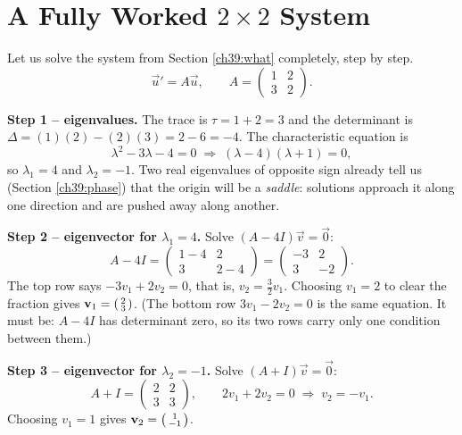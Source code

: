 \section{A Fully Worked \texorpdfstring{$2\times2$}{2x2} System}
\label{ch39:worked}

Let us solve the system from Section \ref{ch39:what} completely, step by step.
\[
  \vec u' = A\vec u, \qquad
  A = \begin{pmatrix} 1 & 2 \\ 3 & 2 \end{pmatrix}.
\]

\textbf{Step 1 -- eigenvalues.} The trace is $\tau = 1 + 2 = 3$ and the
determinant is $\Delta = (1)(2) - (2)(3) = 2 - 6 = -4$. The characteristic
equation is
\[
  \lambda^2 - 3\lambda - 4 = 0 \;\Longrightarrow\; (\lambda - 4)(\lambda + 1) = 0,
\]
so $\lambda_1 = 4$ and $\lambda_2 = -1$. Two real eigenvalues of opposite sign
already tell us (Section \ref{ch39:phase}) that the origin will be a
\emph{saddle}: solutions approach it along one direction and are pushed away
along another.

\textbf{Step 2 -- eigenvector for $\lambda_1 = 4$.} Solve $(A - 4I)\vec v = \vec
0$:
\[
  A - 4I = \begin{pmatrix} 1-4 & 2 \\ 3 & 2-4 \end{pmatrix}
         = \begin{pmatrix} -3 & 2 \\ 3 & -2 \end{pmatrix}.
\]
The top row says $-3v_1 + 2v_2 = 0$, that is, $v_2 = \tfrac{3}{2}v_1$. Choosing
$v_1 = 2$ to clear the fraction gives
$\vec v_1 = \begin{psmallmatrix} 2 \\ 3\end{psmallmatrix}$. (The bottom row
$3v_1 - 2v_2 = 0$ is the same equation. It must be: $A-4I$ has determinant
zero, so its two rows carry only one condition between them.)

\textbf{Step 3 -- eigenvector for $\lambda_2 = -1$.} Solve $(A + I)\vec v = \vec
0$:
\[
  A + I = \begin{pmatrix} 2 & 2 \\ 3 & 3 \end{pmatrix},
  \qquad 2v_1 + 2v_2 = 0 \;\Longrightarrow\; v_2 = -v_1.
\]
Choosing $v_1 = 1$ gives
$\vec v_2 = \begin{psmallmatrix} 1 \\ -1\end{psmallmatrix}$.

